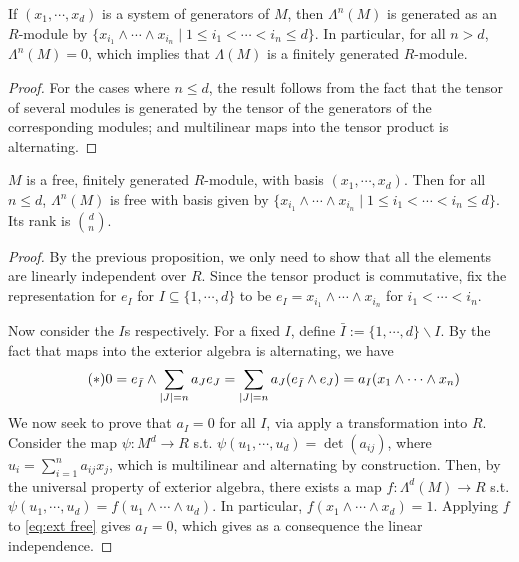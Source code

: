 \documentclass{article}
\begin{document}
\begin{proposition}
    If $(x_1, \cdots, x_d)$ is a system of generators of $M$, then $\Lambda^n(M)$ is generated as an $R$-module by $\{ x_{i_1} \wedge \cdots \wedge x_{i_n} \mid 1 \leq i_1 < \cdots < i_n \leq d \}$. In particular, for all $n > d$, $\Lambda^n(M) = 0$, which implies that $\Lambda(M)$ is a finitely generated $R$-module. 
\end{proposition}

\begin{proof}
    For the cases where $n \leq d$, the result follows from the fact that the tensor of several modules is generated by the tensor of the generators of the corresponding modules; and multilinear maps into the tensor product is alternating.
\end{proof}

\begin{proposition}
    $M$ is a free, finitely generated $R$-module, with basis $(x_1, \cdots, x_d)$. Then for all $n \leq d$, $\Lambda^n(M)$ is free with basis given by $\{x_{i_1} \wedge \cdots \wedge x_{i_n} \mid 1 \leq i_1 < \cdots < i_n \leq d\}$. Its rank is $\binom{d}{n}$.
\end{proposition}

\begin{proof}
    By the previous proposition, we only need to show that all the elements are linearly independent over $R$. Since the tensor product is commutative, fix the representation for $e_I$ for $I \subseteq \{1, \cdots, d\}$ to be $e_I = x_{i_1} \wedge \cdots \wedge x_{i_n}$ for $i_1 < \cdots < i_n$.

    Now consider the $I$s respectively. For a fixed $I$, define $\bar{I} := \{1, \cdots, d\} \backslash I$. By the fact that maps into the exterior algebra is alternating, we have
    \begin{equation}\label{eq:ext free}\tag{$\ast$}
        0 = e_{\bar{I}} \wedge \sum_{\left|J\right| = n} a_J e_J = \sum_{\left|J\right| = n} a_J (e_{\bar{I}} \wedge e_J) = a_I (x_1 \wedge \cdots \wedge x_n)
    \end{equation}
    We now seek to prove that $a_I = 0$ for all $I$, via apply a transformation into $R$. Consider the map $\psi: M^d \to R$ s.t. $\psi(u_1, \cdots, u_d) = \det (a_{ij})$, where $u_i = \sum_{i=1}^n a_{ij} x_j$, which is multilinear and alternating by construction. Then, by the universal property of exterior algebra, there exists a map $f: \Lambda^d(M) \to R$ s.t. $\psi(u_1, \cdots, u_d) = f(u_1 \wedge \cdots \wedge u_d)$. In particular, $f(x_1 \wedge \cdots \wedge x_d) = 1$. Applying $f$ to \eqref{eq:ext free} gives $a_I = 0$, which gives as a consequence the linear independence. 
\end{proof}
\end{document}
